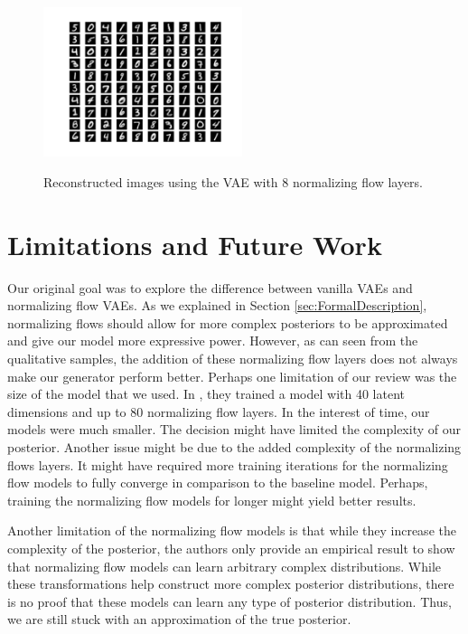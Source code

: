 \documentclass{article}
\begin{document}
\begin{figure}[htbp]
\begin{center}
	\includegraphics[width=0.52\textwidth]{reconstruction_8Layers.png}
\label{fig:NormFlow8}
\caption{Reconstructed images using the VAE with 8 normalizing flow layers.}
\label{fig:NormFlow8}
\end{center}
\end{figure}

\section{Limitations and Future Work}
Our original goal was to explore the difference between vanilla VAEs and normalizing flow VAEs. As we
explained in Section \ref{sec:FormalDescription}, normalizing flows should allow for more complex posteriors 
to be approximated and give our model more expressive power. However, as can seen from the qualitative 
samples, the addition of these normalizing flow layers does not always make our generator perform better. 
Perhaps one limitation of our review was the size of the model that we used. In \citet{RM15}, they trained a 
model with 40 latent dimensions and up to 80 normalizing flow layers. In the interest of time, our models were 
much smaller. The decision might have limited the complexity of our posterior. Another issue might be 
due to the added complexity of the normalizing flows layers. It might have required more training iterations 
for the normalizing flow models to fully converge in comparison to the baseline model. Perhaps, training 
the normalizing flow models for longer might yield better results.

Another limitation of the normalizing flow models is that while they increase the complexity of the posterior, 
the authors only provide an empirical result to show that normalizing flow models can learn arbitrary 
complex distributions. While these transformations help construct more complex posterior distributions, 
there is no proof that these models can learn any type of posterior distribution. Thus, we are still stuck 
with an approximation of the true posterior.
\end{document}

